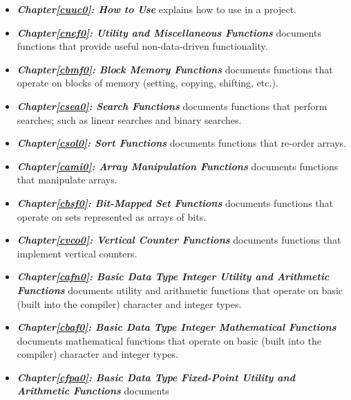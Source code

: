 \begin{itemize}
\item \emph{\textbf{Chapter\postchapterwordnonstretchable{}\ref{cuuc0}: 
      How to Use \productbasenameshort{}}} explains how to use 
      \productbasenameshort{} in a project.  
\item \emph{\textbf{Chapter\postchapterwordnonstretchable{}\ref{cnef0}: 
      Utility and Miscellaneous Functions}} documents functions that provide 
      useful non-data-driven functionality.  
\item \emph{\textbf{Chapter\postchapterwordnonstretchable{}\ref{cbmf0}: 
      Block Memory Functions}} documents functions that operate on blocks of 
      memory (setting, copying, shifting, etc.).  
\item \emph{\textbf{Chapter\postchapterwordnonstretchable{}\ref{csea0}: 
      Search Functions}} documents functions that perform searches; such as 
      linear searches and binary searches.
\item \emph{\textbf{Chapter\postchapterwordnonstretchable{}\ref{csol0}: 
      Sort Functions}} documents functions that re-order arrays.  
\item \emph{\textbf{Chapter\postchapterwordnonstretchable{}\ref{cami0}: 
      Array Manipulation Functions}} documents functions that manipulate arrays.  
\item \emph{\textbf{Chapter\postchapterwordnonstretchable{}\ref{cbsf0}: 
      Bit-Mapped Set Functions}} documents functions that operate on sets 
      represented as arrays of bits.  
\item \emph{\textbf{Chapter\postchapterwordnonstretchable{}\ref{cvco0}: 
      Vertical Counter Functions}} documents functions that implement vertical 
      counters.  
\item \emph{\textbf{Chapter\postchapterwordnonstretchable{}\ref{cafn0}: 
      Basic Data Type Integer Utility and Arithmetic Functions}} documents 
      utility and arithmetic functions that operate on basic (built into the 
      compiler) character and integer types.  
\item \emph{\textbf{Chapter\postchapterwordnonstretchable{}\ref{cbaf0}: 
      Basic Data Type Integer Mathematical Functions}} documents mathematical 
      functions that operate on basic (built into the compiler) character and 
      integer types.  
\item \emph{\textbf{Chapter\postchapterwordnonstretchable{}\ref{cfpa0}: 
      Basic Data Type Fixed-Point Utility and Arithmetic Functions}} documents 

\end{itemize}

